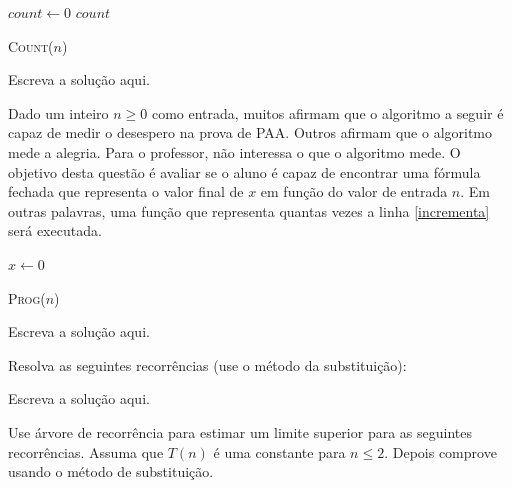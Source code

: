 \documentclass[a4paper]{exam}
\begin{document}
\begin{questions}
\begin{algorithm}[H]
    $count \gets 0$\;
    \Return $count$\;
    \caption{\textsc{Count}($n$)}
  \end{algorithm}
  \begin{solution}
    Escreva a solução aqui.
  \end{solution}
  \question Dado um inteiro $n \geq 0$ como entrada, muitos
  afirmam que o algoritmo a seguir é capaz de medir o desespero na
  prova de PAA. Outros afirmam que o algoritmo mede a alegria. Para
  o professor, não interessa o que o algoritmo mede. O objetivo
  desta questão é avaliar se o aluno é capaz de encontrar uma
  fórmula fechada que representa o valor final de $x$ em função do
  valor de entrada $n$. Em outras palavras, uma função que
  representa quantas vezes a linha \ref{incrementa} será executada.

  \begin{algorithm}[H]
    \NoCaptionOfAlgo
    \DontPrintSemicolon

    $x \gets 0$\;
    \caption{\textsc{Prog}($n$)}
  \end{algorithm}
  \begin{solution}
    Escreva a solução aqui.
  \end{solution}
  \question Resolva as seguintes recorrências (use o método da
  substituição):
  \begin{solution}
    Escreva a solução aqui.
  \end{solution}
  \question Use árvore de recorrência para estimar um limite superior
  para as seguintes recorrências. Assuma que $T(n)$ é uma constante
  para $n \leq 2$. Depois comprove usando o método de
  substituição.
  \begin{parts}

\end{parts}
\end{questions}
\end{document}
